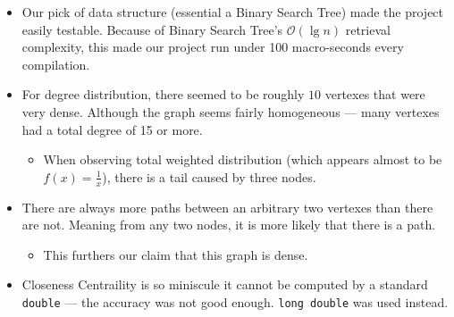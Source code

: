 \documentclass{article}
\newcommand{\shellcmd}[1]{\texttt{\colorbox{gray!30}{#1}}}
\begin{document}
\begin{itemize}
    \item Our pick of data structure (essential a Binary Search Tree) made the project easily testable. Because of Binary Search Tree's $\mathcal{O}(\lg n)$ retrieval complexity, this made our project run under 100 macro-seconds every compilation.
    \item For degree distribution, there seemed to be roughly $10$ vertexes that were very dense. Although the graph seems fairly homogeneous — many vertexes had a total degree of 15 or more.
    \begin{itemize}
        \item When observing total weighted distribution (which appears almost to be $f(x) = \frac{1}{x}$), there is a tail caused by three nodes.
    \end{itemize}
    \item There are always more paths between an arbitrary two vertexes than there are not. Meaning from any two nodes, it is more likely that there is a path.
    \begin{itemize}
        \item This furthers our claim that this graph is dense.
    \end{itemize}
    \item Closeness Centraility is so miniscule it cannot be computed by a standard \shellcmd{double} --- the accuracy was not good enough. \shellcmd{long double} was used instead.
\end{itemize}
\end{document}
